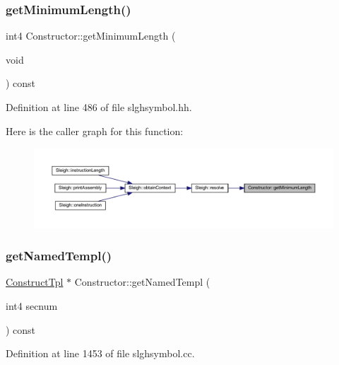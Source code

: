 \subsubsection{\texorpdfstring{getMinimumLength()}{getMinimumLength()}}
{\footnotesize\ttfamily int4 Constructor\+::get\+Minimum\+Length (\begin{DoxyParamCaption}\item[{void}]{ }\end{DoxyParamCaption}) const\hspace{0.3cm}{\ttfamily [inline]}}



Definition at line 486 of file slghsymbol.\+hh.

Here is the caller graph for this function\+:
\nopagebreak
\begin{figure}[H]
\begin{center}
\leavevmode
\includegraphics[width=350pt]{class_constructor_a577c1bfb784dc0db4be055dad2155ad5_icgraph}
\end{center}
\end{figure}
\mbox{\label{class_constructor_afa9add72555c1956fcd48a68b7ff5107}} 
\subsubsection{\texorpdfstring{getNamedTempl()}{getNamedTempl()}}
{\footnotesize\ttfamily \mbox{\hyperlink{class_construct_tpl}{Construct\+Tpl}} $\ast$ Constructor\+::get\+Named\+Templ (\begin{DoxyParamCaption}\item[{int4}]{secnum }\end{DoxyParamCaption}) const}



Definition at line 1453 of file slghsymbol.\+cc.

